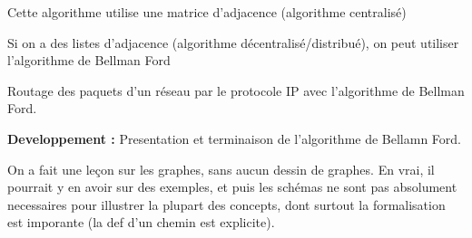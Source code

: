 \begin{rem}
	Cette algorithme utilise une matrice d'adjacence (algorithme centralisé)
\end{rem}

\begin{algo}
	Si on a des listes d'adjacence (algorithme décentralisé/distribué), on peut utiliser l'algorithme de Bellman Ford
\end{algo}

\begin{appl}
	Routage des paquets d'un réseau par le protocole IP avec l'algorithme de Bellman Ford.
\end{appl}

\noindent \textbf{Developpement :} Presentation et terminaison de l'algorithme de Bellamn Ford.


\begin{com}
	On a fait une leçon sur les graphes, sans aucun dessin de graphes. En vrai, il pourrait y en avoir sur des exemples, et puis les schémas ne sont pas absolument necessaires pour illustrer la plupart des concepts, dont surtout la formalisation est imporante (la def d'un chemin est explicite).
\end{com}
